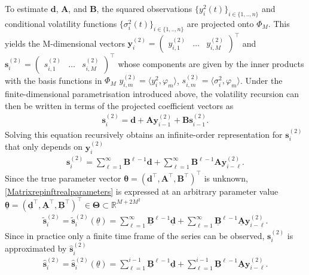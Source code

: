 \documentclass[12pt,a4paper]{article}
\theoremstyle{definition}
\begin{document}
To estimate $\mathbf{d}$, $\mathbf{A}$, and $\mathbf{B}$, the squared observations $\{y_i^2(t)\}_{i\in\{1,..,n\}}$ and conditional volatility functions $\{\sigma_i^2(t)\}_{i\in\{1,..,n\}}$ are projected onto $\Phi_M$. This yields the M-dimensional vectors $\mathbf{y}_i^{(2)}=\begin{pmatrix}
    y_{i,1}^{(2)} & \ldots & y_{i,M}^{(2)}
\end{pmatrix}^\top$ and $\mathbf{s}_i^{(2)}=\begin{pmatrix}
    s_{i,1}^{(2)} & \ldots & s_{i,M}^{(2)}
\end{pmatrix}^\top$ whose components are given by the inner products with the basis functions in $\Phi_M$ $y_{i,m}^{(2)}=\langle y_i^2,\varphi_m\rangle$, $s_{i,m}^{(2)}=\langle \sigma_i^2,\varphi_m\rangle$. Under the finite-dimensional parametrisation introduced above, the volatility recursion can then be written in terms of the projected coefficient vectors as
\begin{align}
\label{FGARCH11MatrixForm}
    \mathbf{s}_i^{(2)}=\mathbf{d}+\mathbf{Ay}_{i-1}^{(2)}+\mathbf{Bs}_{i-1}^{(2)}.
\end{align}
Solving this equation recursively obtains an infinite-order representation for $\mathbf{s}_i^{(2)}$ that only depends on $\mathbf{y}_{i}^{(2)}$
\begin{align}
\label{Matrixrepinftrealparameters}
    \mathbf{s}_i^{(2)}=\sum_{\ell=1}^{\infty} \mathbf{B}^{\ell-1}\mathbf{d}+\sum_{\ell=1}^{\infty}\mathbf{B}^{\ell-1}\mathbf{Ay}_{i-\ell}^{(2)}.
\end{align}
Since the true parameter vector $\mathbf{\theta}=(\mathbf{d}^{\top},\mathbf{A}^\top,\mathbf{B}^\top)^\top$ is unknown, \cref{Matrixrepinftrealparameters} is expressed at an arbitrary parameter value $\mathbf{\underline{\theta}}=(\underline{\mathbf{d}}^{\top},\underline{\mathbf{A}}^\top,\underline{\mathbf{B}}^\top)^\top\in\mathbf{\Theta}\subset\mathbb{R}^{M+2M^2}$
\begin{align}
    \mathbf{\tilde{s}}_i^{(2)}=\mathbf{\tilde{s}}_i^{(2)}(\underline{\theta})=\sum_{\ell=1}^{\infty}\underline{\mathbf{B}}^{\ell-1}\underline{\mathbf{d}}+\sum_{\ell=1}^{\infty}\underline{\mathbf{B}}^{\ell-1}\underline{\mathbf{A}}\mathbf{y}_{i-\ell}^{(2)}.
\end{align}
Since in practice only a finite time frame of the series can be observed, $\mathbf{s}_i^{(2)}$ is approximated by $\mathbf{\hat{s}}_i^{(2)}$
\begin{align}
\label{ApproximateFiniteSum}
    \mathbf{\hat{s}}_i^{(2)}=\mathbf{\hat{s}}_i^{(2)}(\underline{\theta})=\sum_{\ell=1}^{i-1}\underline{\mathbf{B}}^{\ell-1}\underline{\mathbf{d}}+\sum_{\ell=1}^{i-1}\underline{\mathbf{B}}^{\ell-1}\underline{\mathbf{A}}\mathbf{y}_{i-\ell}^{(2)}.
\end{align}
\end{document}
